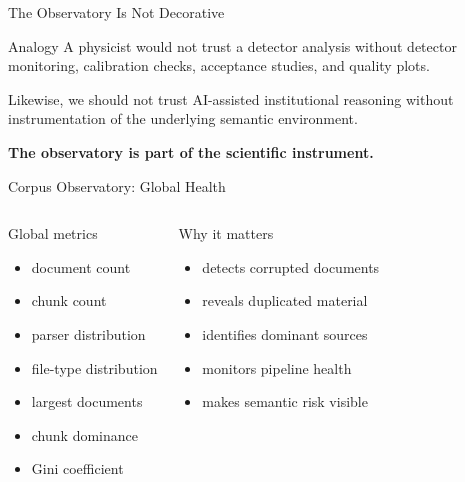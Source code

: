 \documentclass[aspectratio=169]{beamer}
\begin{document}
\begin{frame}{The Observatory Is Not Decorative}

\Large

\begin{block}{Analogy}
A physicist would not trust a detector analysis without detector monitoring, calibration checks, acceptance studies, and quality plots.
\end{block}

\vspace{0.6cm}

Likewise, we should not trust AI-assisted institutional reasoning without instrumentation of the underlying semantic environment.

\vspace{0.6cm}

\begin{center}
\textbf{The observatory is part of the scientific instrument.}
\end{center}

\end{frame}

\begin{frame}{Corpus Observatory: Global Health}

\begin{columns}[T]

\begin{block}{Global metrics}
\begin{itemize}
\item document count
\item chunk count
\item parser distribution
\item file-type distribution
\item largest documents
\item chunk dominance
\item Gini coefficient
\end{itemize}
\end{block}


\begin{block}{Why it matters}
\begin{itemize}
\item detects corrupted documents
\item reveals duplicated material
\item identifies dominant sources
\item monitors pipeline health
\item makes semantic risk visible
\end{itemize}
\end{block}

\end{columns}

\end{frame}
\end{document}
